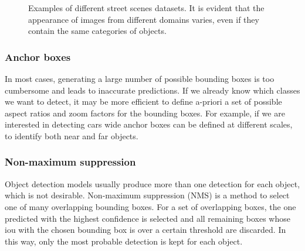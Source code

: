 \documentclass[%
    corpo=12pt,
    twoside,
    stile=classica,   
    tipotesi=magistrale,
    evenboxes,
    english
]{toptesi}
\begin{document}
\begin{figure}[ht]
	\centering
	\caption{Examples of different street scenes datasets. It is evident that the appearance of images from different domains varies, even if they contain the same categories of objects.}
	\label{fig:datasets}
\end{figure}

\subsubsection{Anchor boxes}\label{sec:anchor}
In most cases, generating a large number of possible bounding boxes is too cumbersome and leads to inaccurate predictions. If we already know which classes we want to detect, it may be more efficient to define a-priori a set of possible aspect ratios and zoom factors for the bounding boxes. For example, if we are interested in detecting cars wide anchor boxes can be defined at different scales, to identify both near and far objects.

\subsubsection{Non-maximum suppression}
Object detection models usually produce more than one detection for each object, which is not desirable. Non-maximum suppression (NMS) is a method to select one of many overlapping bounding boxes. For a set of overlapping boxes, the one predicted with the highest confidence is selected and all remaining boxes whose \gls{iou} with the chosen bounding box is over a certain threshold are discarded. In this way, only the most probable detection is kept for each object.
\end{document}

